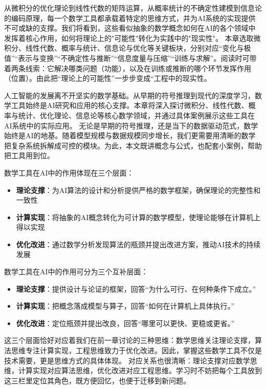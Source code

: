 从微积分的优化理论到线性代数的矩阵运算，从概率统计的不确定性建模到信息论的编码原理，每一个数学工具都承载着特定的思维方式，并为AI系统的实现提供不可或缺的支撑。我们将看到，这些看似抽象的数学概念如何在AI的各个领域中发挥着核心作用，如何将理论上的"可能性"转化为实践中的"现实性"。
本章选取微积分、线性代数、概率与统计、信息论与优化等关键板块，分别对应“变化与极值”“表示与变换”“不确定性与推断”“信息度量与压缩”“训练与求解”。阅读时可带着两条线索：它解决哪类问题（功能），以及在训练或推断的哪个环节发挥作用（位置）。由此把“理论上的可能性”一步步变成“工程中的现实性。

人工智能的发展离不开坚实的数学基础。从早期的符号推理到现代的深度学习，数学工具始终是AI研究和应用的核心支撑。本章将深入探讨微积分、线性代数、概率与统计、优化理论、信息论等核心数学领域，并通过具体案例展示这些工具在AI系统中的实际应用。
无论是早期的符号推理，还是当下的数据驱动范式，数学始终是AI的地基。随着模型规模与数据规模同步增长，我们更需要用清晰的数学把复杂系统拆解成可控的模块。为此，本文既讲概念与公式，也配套小案例，帮助把工具用到位。

数学工具在AI中的作用体现在三个层面：
\begin{itemize}
\item \textbf{理论支撑}：为AI算法的设计和分析提供严格的数学框架，确保理论的完整性和一致性
\item \textbf{计算实现}：将抽象的AI概念转化为可计算的数学模型，使理论能够在计算机上得以实现
\item \textbf{优化改进}：通过数学分析发现算法的瓶颈并提出改进方案，推动AI技术的持续发展
\end{itemize}
数学工具在AI中的作用可分为三个互补层面：
\begin{itemize}
\item \textbf{理论支撑}：提供设计与论证的框架，回答“为什么可行、在何种条件下成立。” 
\item \textbf{计算实现}：把概念落成模型与算子，回答“如何在计算机上具体执行。” 
\item \textbf{优化改进}：定位瓶颈并提出改良，回答“哪里可以更快、更稳或更省。” 
\end{itemize}

这三个层面恰好对应着我们在前一章讨论的三种思维：数学思维关注理论支撑，算法思维专注计算实现，工程思维致力于优化改进。因此，掌握这些数学工具不仅是技术需要，更是思维方式的具体体现。
对应关系也很清晰：理论支撑对应数学思维，计算实现对应算法思维，优化改进对应工程思维。学习时不妨把每个工具放到这三栏里定位其角色，既方便回忆，也便于迁移到新问题。

